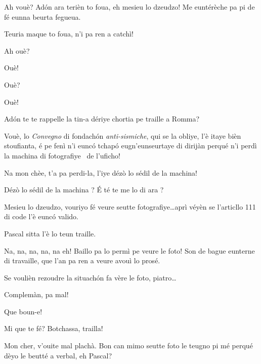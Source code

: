 \begin{drama}
\Bertinaspeaks Ah vouè? Adón ara terièn to foua, eh mesieu lo dzeudzo! Me euntérèche pa pi de fé eunna beurta fegueua.

\Tobiespeaks Teuria maque to foua, n’i pa ren a catchì!

\Bertinaspeaks Ah ouè?

\Tobiespeaks Ouè!

\Bertinaspeaks Ouè?

\Tobiespeaks Ouè!

\Bertinaspeaks Ad\'on te te rappelle la tin-a dériye chortia pe traille a Romma?

\Tobiespeaks Vouè, lo \textit{Convegno} di fondachón \textit{anti-sismiche}, qui se la obliye, l’è itaye bièn stoufianta, é pe fenì n’i eunc\'o tchap\'o eugn’eunseurtaye di dirijàn perqué n’i perdì la machina di fotografiye \macchinaFoto\ de l’uficho!

\Bertinaspeaks Na mon chèe, t’a pa perdi-la, l'iye dézò lo sédil de la machina!

\Tobiespeaks {} Dézò lo sédil de la machina ? É té te me lo di ara ?

\Bertinaspeaks Mesieu lo dzeudzo, vouriyo fé veure seutte fotografiye\ldots aprì véyèn se l’articllo 111 di code l’è eunc\'o valido.

\DzeudzoSenliquerspeaks Pascal sitta l’è lo teun traille.

\Tobiespeaks Na, na, na, na, na eh!  Baillo pa lo permì pe veure le foto! Son de bague eunterne di travaille, que l’an pa ren a veure avouì lo prosé.

\DzeudzoSenliquerspeaks Se voulièn rezoudre la situach\'on fa vère le foto, piatro\ldots



\DzeudzoSenliquerspeaks {} Complemàn, pa mal!

\Simonspeaks Que boun-e!

\Eumprezeospeaks Mi que te fé? Botchassa, trailla!

\DzeudzoSenliquerspeaks {} Mon cher, v'ouite mal plachà. Bon can mimo seutte foto le teugno pi mé perqué dèyo le beutté a verbal, eh Pascal?  \ok


\end{drama}

